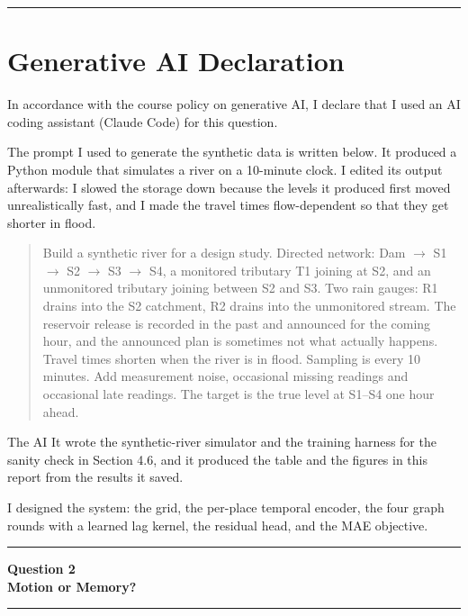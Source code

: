 \documentclass[11pt,letterpaper]{article}
\newcommand{\taskbanner}[2]{\begin{center}{\small\bfseries #1}\\[3pt]{\Large\bfseries #2}\end{center}\vspace{2pt}\hrule\vspace{8pt}}
\begin{document}
\vspace{10pt}
\hrule
\vspace{4pt}

\section*{Generative AI Declaration}

In accordance with the course policy on generative AI, I declare that I used an AI
coding assistant (Claude Code) for this question.

The prompt I used to generate the synthetic data is written below.
It produced a Python module that simulates a river on a 10-minute clock. I edited
its output afterwards: I slowed the storage down because the levels it produced
first moved unrealistically fast, and I made the travel times flow-dependent so that
they get shorter in flood.

\begin{quote}
\small
Build a synthetic river for a design study. Directed network: Dam $\to$ S1 $\to$
S2 $\to$ S3 $\to$ S4, a monitored tributary T1 joining at S2, and an unmonitored
tributary joining between S2 and S3. Two rain gauges: R1 drains into the S2
catchment, R2 drains into the unmonitored stream. The reservoir release is
recorded in the past and announced for the coming hour, and the announced plan
is sometimes not what actually happens. Travel times shorten when the river is
in flood. Sampling is every 10 minutes. Add measurement noise, occasional
missing readings and occasional late readings. The target is the true level at
S1--S4 one hour ahead.
\end{quote}

The AI It wrote the synthetic-river simulator and the training harness for the
sanity check in Section 4.6, and it produced the table and the figures in this
report from the results it saved.

I designed the system: the grid, the per-place temporal encoder, the four
graph rounds with a learned lag kernel, the residual head, and the MAE objective.

\vspace{10pt}
\hrule
\vspace{4pt}

\newpage

\taskbanner{Question 2}{Motion or Memory?}

\setcounter{table}{0}
\setcounter{figure}{0}
\end{document}
